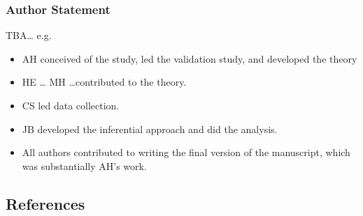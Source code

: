 \documentclass[
  single column]{article}
\providecommand{\tightlist}{%
  \setlength{\itemsep}{0pt}\setlength{\parskip}{0pt}}\usepackage{longtable,booktabs,array}
\begin{document}
\subsubsection{Author Statement}\label{author-statement}

TBA\ldots{} e.g.~

\begin{itemize}
\tightlist
\item
  AH conceived of the study, led the validation study, and developed the
  theory
\item
  HE \ldots{} MH \ldots contributed to the theory.
\item
  CS led data collection.
\item
  JB developed the inferential approach and did the analysis.\\
\item
  All authors contributed to writing the final version of the
  manuscript, which was substantially AH's work.
\end{itemize}

\newpage{}

\subsection{References}\label{references}
\end{document}
